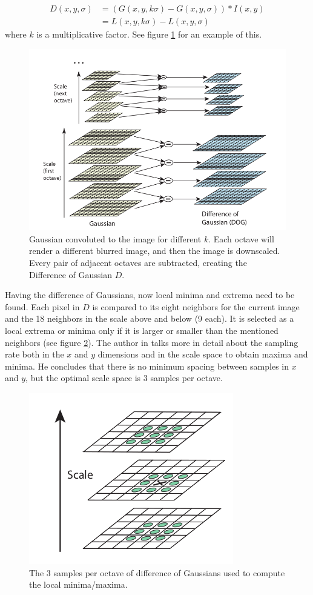 \documentclass[../main.tex]{subfiles}
\begin{document}
\begin{equation}
    \begin{aligned}
    D(x, y, \sigma) &=(G(x, y, k \sigma)-G(x, y, \sigma)) * I(x, y) \\
    &=L(x, y, k \sigma)-L(x, y, \sigma)
    \end{aligned}
\end{equation}
where $k$ is a multiplicative factor. See figure \ref{fig:scale_space_SIFT} for an example of this.
\begin{figure}[htbp]
    \centering
    \includegraphics[width=0.9\linewidth]{images/scale_space_SIFT.png}
    \caption{Gaussian convoluted to the image for different $k$. Each octave will render a different blurred image, and then the image is downscaled. Every pair of adjacent octaves are subtracted, creating the Difference of Gaussian $D$.}
    \label{fig:scale_space_SIFT}
\end{figure}

Having the difference of Gaussians, now local minima and extrema need to be found. Each pixel in $D$ is compared to its eight neighbors for the current image and the 18 neighbors in the scale above and below (9 each). It is selected as a local extrema or minima only if it is larger or smaller than the mentioned neighbors (see figure \ref{fig:DOG_maxmin_SIFT}). The author in \cite{SIFTlowe2004} talks more in detail about the sampling rate both in the $x$ and $y$ dimensions and in the scale space to obtain maxima and minima. He concludes that there is no minimum spacing between samples in $x$ and $y$, but the optimal scale space is 3 samples per octave.

\begin{figure}[htbp]
    \centering
    \includegraphics[width=0.4\linewidth]{images/DOG_maxmin_SIFT.png}
    \caption{The 3 samples per octave of difference of Gaussians used to compute the local minima/maxima.}
    \label{fig:DOG_maxmin_SIFT}
\end{figure}
\end{document}
